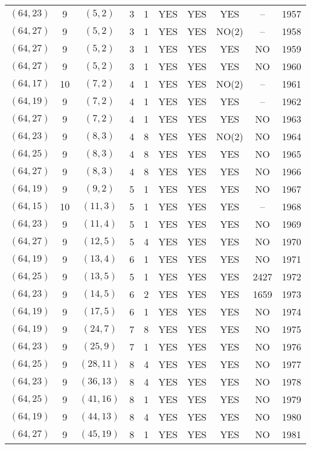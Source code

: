 \begin{longtable}{|c|c|c|c|c|c|c|c|c|c|}
$(64, 23)$ & 9 & $(5, 2)$ & 3 & 1 & YES & YES & YES & -- & 1957\\
$(64, 27)$ & 9 & $(5, 2)$ & 3 & 1 & YES & YES & NO(2) & -- & 1958\\
$(64, 27)$ & 9 & $(5, 2)$ & 3 & 1 & YES & YES & YES & NO & 1959\\
$(64, 27)$ & 9 & $(5, 2)$ & 3 & 1 & YES & YES & YES & NO & 1960\\
$(64, 17)$ & 10 & $(7, 2)$ & 4 & 1 & YES & YES & NO(2) & -- & 1961\\
$(64, 19)$ & 9 & $(7, 2)$ & 4 & 1 & YES & YES & YES & -- & 1962\\
$(64, 27)$ & 9 & $(7, 2)$ & 4 & 1 & YES & YES & YES & NO & 1963\\
$(64, 23)$ & 9 & $(8, 3)$ & 4 & 8 & YES & YES & NO(2) & NO & 1964\\
$(64, 25)$ & 9 & $(8, 3)$ & 4 & 8 & YES & YES & YES & NO & 1965\\
$(64, 27)$ & 9 & $(8, 3)$ & 4 & 8 & YES & YES & YES & NO & 1966\\
$(64, 19)$ & 9 & $(9, 2)$ & 5 & 1 & YES & YES & YES & NO & 1967\\
$(64, 15)$ & 10 & $(11, 3)$ & 5 & 1 & YES & YES & YES & -- & 1968\\
$(64, 23)$ & 9 & $(11, 4)$ & 5 & 1 & YES & YES & YES & NO & 1969\\
$(64, 27)$ & 9 & $(12, 5)$ & 5 & 4 & YES & YES & YES & NO & 1970\\
$(64, 19)$ & 9 & $(13, 4)$ & 6 & 1 & YES & YES & YES & NO & 1971\\
$(64, 25)$ & 9 & $(13, 5)$ & 5 & 1 & YES & YES & YES & 2427 & 1972\\
$(64, 23)$ & 9 & $(14, 5)$ & 6 & 2 & YES & YES & YES & 1659 & 1973\\
$(64, 19)$ & 9 & $(17, 5)$ & 6 & 1 & YES & YES & YES & NO & 1974\\
$(64, 19)$ & 9 & $(24, 7)$ & 7 & 8 & YES & YES & YES & NO & 1975\\
$(64, 23)$ & 9 & $(25, 9)$ & 7 & 1 & YES & YES & YES & NO & 1976\\
$(64, 25)$ & 9 & $(28, 11)$ & 8 & 4 & YES & YES & YES & NO & 1977\\
$(64, 23)$ & 9 & $(36, 13)$ & 8 & 4 & YES & YES & YES & NO & 1978\\
$(64, 25)$ & 9 & $(41, 16)$ & 8 & 1 & YES & YES & YES & NO & 1979\\
$(64, 19)$ & 9 & $(44, 13)$ & 8 & 4 & YES & YES & YES & NO & 1980\\
$(64, 27)$ & 9 & $(45, 19)$ & 8 & 1 & YES & YES & YES & NO & 1981\\

\end{longtable}
